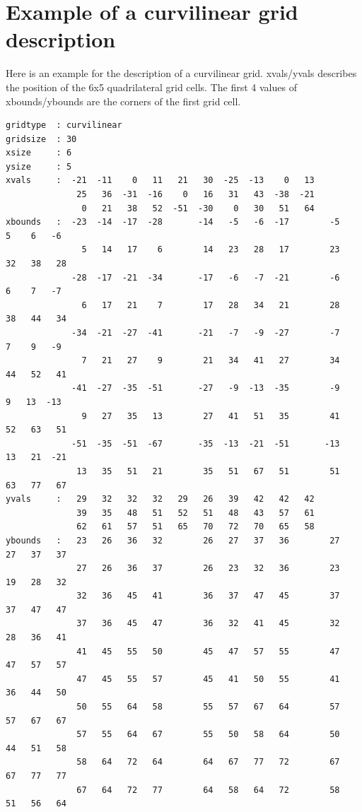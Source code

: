 \section{Example of a curvilinear grid description}
Here is an example for the \CDO description of a curvilinear grid.
xvals/yvals describes the position of the 6x5 quadrilateral grid cells.
The first 4 values of xbounds/ybounds are the corners of the first grid cell.
\begin{lstlisting}[frame=single, backgroundcolor=\color{zebg}, basicstyle=\footnotesize]
gridtype  : curvilinear
gridsize  : 30
xsize     : 6
ysize     : 5
xvals     :  -21  -11    0   11   21   30  -25  -13    0   13
              25   36  -31  -16    0   16   31   43  -38  -21
               0   21   38   52  -51  -30    0   30   51   64
xbounds   :  -23  -14  -17  -28       -14   -5   -6  -17        -5    5    6   -6
               5   14   17    6        14   23   28   17        23   32   38   28
             -28  -17  -21  -34       -17   -6   -7  -21        -6    6    7   -7
               6   17   21    7        17   28   34   21        28   38   44   34
             -34  -21  -27  -41       -21   -7   -9  -27        -7    7    9   -9
               7   21   27    9        21   34   41   27        34   44   52   41
             -41  -27  -35  -51       -27   -9  -13  -35        -9    9   13  -13
               9   27   35   13        27   41   51   35        41   52   63   51
             -51  -35  -51  -67       -35  -13  -21  -51       -13   13   21  -21
              13   35   51   21        35   51   67   51        51   63   77   67
yvals     :   29   32   32   32   29   26   39   42   42   42
              39   35   48   51   52   51   48   43   57   61
              62   61   57   51   65   70   72   70   65   58
ybounds   :   23   26   36   32        26   27   37   36        27   27   37   37
              27   26   36   37        26   23   32   36        23   19   28   32
              32   36   45   41        36   37   47   45        37   37   47   47
              37   36   45   47        36   32   41   45        32   28   36   41
              41   45   55   50        45   47   57   55        47   47   57   57
              47   45   55   57        45   41   50   55        41   36   44   50
              50   55   64   58        55   57   67   64        57   57   67   67
              57   55   64   67        55   50   58   64        50   44   51   58
              58   64   72   64        64   67   77   72        67   67   77   77
              67   64   72   77        64   58   64   72        58   51   56   64
\end{lstlisting}

